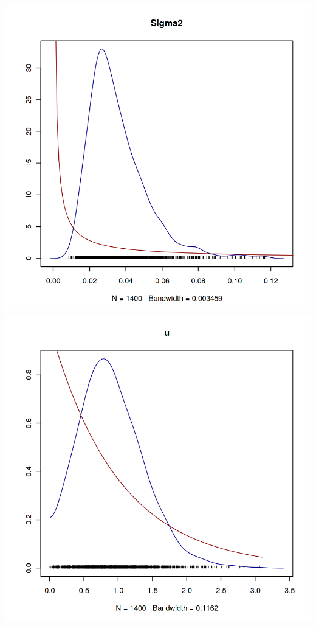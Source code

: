 \documentclass[12pt,a4paper]{article}
\begin{document}
\begin{enumerate}[(a)]
\includegraphics[scale=0.25]{./images/1_Figure3_sigma_posterior.png}
\includegraphics[scale=0.25]{./images/1_Figure3_u_posterior.png}


\end{enumerate}
\end{document}
